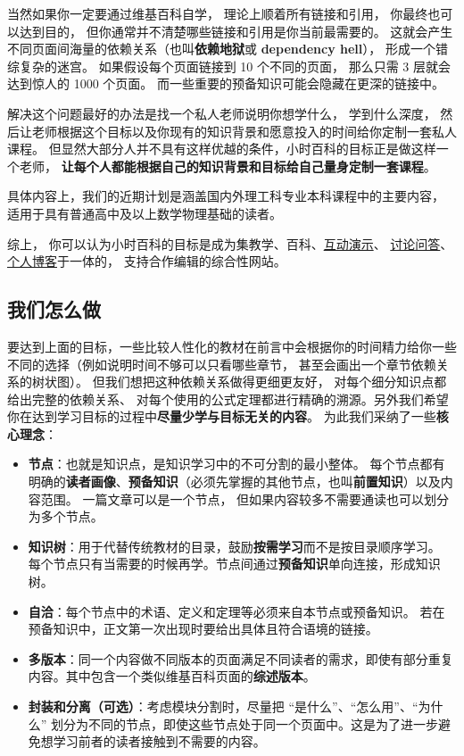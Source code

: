 当然如果你一定要通过维基百科自学， 理论上顺着所有链接和引用， 你最终也可以达到目的， 但你通常并不清楚哪些链接和引用是你当前最需要的。 这就会产生不同页面间海量的依赖关系（也叫\textbf{依赖地狱}或 \textbf{dependency hell}）， 形成一个错综复杂的迷宫。 如果假设每个页面链接到 10 个不同的页面， 那么只需 3 层就会达到惊人的 1000 个页面。 而一些重要的预备知识可能会隐藏在更深的链接中。

解决这个问题最好的办法是找一个私人老师说明你想学什么， 学到什么深度， 然后让老师根据这个目标以及你现有的知识背景和愿意投入的时间给你定制一套私人课程。 但显然大部分人并不具有这样优越的条件，小时百科的目标正是做这样一个老师， \textbf{让每个人都能根据自己的知识背景和目标给自己量身定制一套课程}。

具体内容上，我们的近期计划是涵盖国内外理工科专业本科课程中的主要内容， 适用于具有普通高中及以上数学物理基础的读者。

综上， 你可以认为小时百科的目标是成为集教学、百科、\href{http://wuli.wiki/apps}{互动演示}、 \href{http://wuli.wiki/forum}{讨论问答}、 \href{http://wuli.wiki/note}{个人博客}于一体的， 支持合作编辑的综合性网站。

\subsection{我们怎么做}
要达到上面的目标，一些比较人性化的教材在前言中会根据你的时间精力给你一些不同的选择（例如说明时间不够可以只看哪些章节， 甚至会画出一个章节依赖关系的树状图）。 但我们想把这种依赖关系做得更细更友好， 对每个细分知识点都给出完整的依赖关系、 对每个使用的公式定理都进行精确的溯源。另外我们希望你在达到学习目标的过程中\textbf{尽量少学与目标无关的内容}。 为此我们采纳了一些\textbf{核心理念}：
\begin{itemize}
\item \textbf{节点}：也就是知识点，是知识学习中的不可分割的最小整体。 每个节点都有明确的\textbf{读者画像}、\textbf{预备知识}（必须先掌握的其他节点，也叫\textbf{前置知识}）以及内容范围。 一篇文章可以是一个节点， 但如果内容较多不需要通读也可以划分为多个节点。
\item \textbf{知识树}：用于代替传统教材的目录，鼓励\textbf{按需学习}而不是按目录顺序学习。 每个节点只有当需要的时候再学。节点间通过\textbf{预备知识}单向连接，形成知识树。
\item \textbf{自洽}：每个节点中的术语、定义和定理等必须来自本节点或预备知识。 若在预备知识中，正文第一次出现时要给出具体且符合语境的链接。
\item \textbf{多版本}：同一个内容做不同版本的页面满足不同读者的需求，即使有部分重复内容。其中包含一个类似维基百科页面的\textbf{综述版本}。
\item \textbf{封装和分离（可选）}：考虑模块分割时，尽量把 “是什么”、“怎么用”、“为什么” 划分为不同的节点，即使这些节点处于同一个页面中。这是为了进一步避免想学习前者的读者接触到不需要的内容。
\end{itemize}

